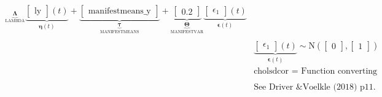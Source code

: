 \documentclass[a4paper,landscape]{report}
\newcommand{\vect}[1]{\boldsymbol{\mathbf{#1}}}
\begin{document}
\begin{footnotesize}
\begin{align*}
{        }_{\underbrace{\vect{\Lambda}}_\textrm{LAMBDA}} \underbrace{
          \begin{bmatrix}
\text{ly}
\end{bmatrix} 
          (t)}_{\vect{\eta}(t)} +
        \underbrace{
          \begin{bmatrix}
\text{manifestmeans\_y}
\end{bmatrix} 
        }_{\underbrace{\vect{\tau}}_\textrm{MANIFESTMEANS}} + 
              \underbrace{
                \begin{bmatrix}
0.2
\end{bmatrix}  
              }_{\underbrace{\vect{\Theta}}_\textrm{MANIFESTVAR}}
              \underbrace{
          \begin{bmatrix}
\epsilon_{1}
\end{bmatrix} 
          (t)}_{\vect{\epsilon}(t)} \\ \\
          &\underbrace{
            \begin{bmatrix}
\epsilon_{1}
\end{bmatrix} 
            (t)}_{\vect{\epsilon}(t)} \sim  \mathrm{N} \left(
              \begin{bmatrix}
0
\end{bmatrix}
              ,
                \begin{bmatrix}
1
\end{bmatrix} \right) \\
&\textrm{cholsdcor = Function converting lower tri matrix of std dev and unconstrained correlation to Cholesky factor.} \\ \\ 
&\textrm{See Driver \& Voelkle (2018) p11.}
      \end{align*}
      \end{footnotesize}
      
\end{document}
